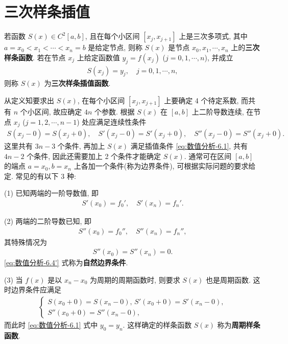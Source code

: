 \documentclass[../../main.tex]{subfiles}%
\begin{document}
\section{三次样条插值}

\begin{definition}[三次样条函数]
若函数 $S(x) \in C^2[a, b]$, 且在每个小区间 $[x_j, x_{j + 1}]$ 上是三次多项式, 其中 $a = x_0 < x_1 < \cdots < x_n = b$ 是给定节点, 则称 $S(x)$ 是节点 $x_0, x_1, \cdots, x_n$ 上的\textbf{三次样条函数}. 若在节点 $x_j$ 上给定函数值 $y_j = f(x_j)$ ($j = 0, 1, \cdots, n$), 并成立
\begin{align}
S(x_j) = y_j, \quad j = 0, 1, \cdots, n, \label{eq:数值分析-6.1}
\end{align}
则称 $S(x)$ 为\textbf{三次样条插值函数}.
\end{definition}
\begin{remark}
从定义知要求出 $S(x)$, 在每个小区间 $[x_j, x_{j + 1}]$ 上要确定 4 个待定系数, 而共有 $n$ 个小区间, 故应确定 $4n$ 个参数. 根据 $S(x)$ 在 $[a, b]$ 上二阶导数连续, 在节点 $x_j$ ($j = 1, 2, \cdots, n - 1$) 处应满足连续性条件
\begin{align}
S(x_j - 0) = S(x_j + 0), \quad S'(x_j - 0) = S'(x_j + 0), \quad S''(x_j - 0) = S''(x_j + 0). \label{eq:数值分析-6.2}
\end{align}
这里共有 $3n - 3$ 个条件, 再加上 $S(x)$ 满足插值条件 \eqref{eq:数值分析-6.1}, 共有 $4n - 2$ 个条件, 因此还需要加上 2 个条件才能确定 $S(x)$. 通常可在区间 $[a, b]$ 的端点 $a = x_0, b = x_n$ 上各加一个条件(称为边界条件), 可根据实际问题的要求给定. 常见的有以下 3 种:

(1) 已知两端的一阶导数值, 即
\begin{align}
S'(x_0) = f_0', \quad S'(x_n) = f_n'. \label{eq:数值分析-6.3}
\end{align}

(2) 两端的二阶导数已知, 即
\begin{align}
S''(x_0) = f_0'', \quad S''(x_n) = f_n'', \label{eq:数值分析-6.4}
\end{align}
其特殊情况为
\begin{align}
S''(x_0) = S''(x_n) = 0. \label{eq:数值分析-6.4'}
\end{align}
\eqref{eq:数值分析-6.4'} 式称为\textbf{自然边界条件}.

(3) 当 $f(x)$ 是以 $x_n - x_0$ 为周期的周期函数时, 则要求 $S(x)$ 也是周期函数. 这时边界条件应满足
\begin{align}
\begin{cases}
S(x_0 + 0) = S(x_n - 0), \, S'(x_0 + 0) = S'(x_n - 0), \\
S''(x_0 + 0) = S''(x_n - 0),
\end{cases} \label{eq:数值分析-6.5}
\end{align}
而此时 \eqref{eq:数值分析-6.1} 式中 $y_0 = y_n$. 这样确定的样条函数 $S(x)$ 称为\textbf{周期样条函数}.
\end{remark}
\end{document}
